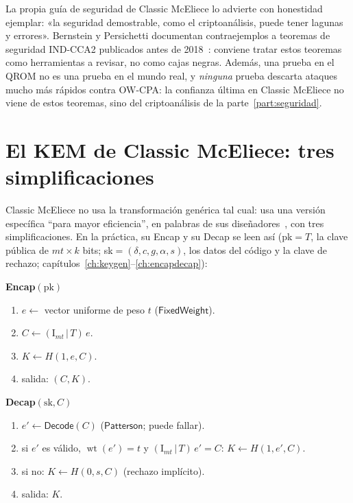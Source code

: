 \documentclass[11pt,a4paper,oneside]{report}
\newcommand{\wt}{\operatorname{wt}}
\begin{document}
\begin{rigor}
La propia guía de seguridad de Classic McEliece lo advierte con
honestidad ejemplar: «la seguridad demostrable, como el
criptoanálisis, puede tener lagunas y errores». Bernstein y Persichetti
documentan contraejemplos a teoremas de seguridad IND-CCA2 publicados
antes de 2018~\cite{bp2018}: conviene tratar estos teoremas como
herramientas a revisar, no como cajas negras. Además, una prueba en el
QROM no es una prueba en el mundo real, y \emph{ninguna} prueba
descarta ataques mucho más rápidos contra OW-CPA: la confianza última
en Classic McEliece no viene de estos teoremas, sino del criptoanálisis
de la parte~\ref{part:seguridad}.
\end{rigor}

\section{El KEM de Classic McEliece: tres simplificaciones}

Classic McEliece no usa la transformación genérica tal cual: usa una
versión específica ``para mayor eficiencia'', en palabras de sus
diseñadores~\cite{cmrationale}, con tres simplificaciones. En la
práctica, su \textsf{Encap} y su \textsf{Decap} se leen así
(pk$=T$, la clave pública de $mt\times k$ bits;
sk$=(\delta,c,g,\alpha,s)$, los datos del código y la clave de rechazo;
capítulos~\ref{ch:keygen}--\ref{ch:encapdecap}):

\begin{practica}
\begin{minipage}[t]{0.47\textwidth}\raggedright
\textbf{\textsf{Encap}$(\mathrm{pk})$}
\begin{enumerate}[leftmargin=1.4em,itemsep=2pt,topsep=2pt]
  \item $e\leftarrow$ vector uniforme de peso $t$
        ($\textsf{FixedWeight}$).
  \item $C\leftarrow(\mathrm{I}_{mt}\,|\,T)\,e$.
  \item $K\leftarrow H(1,e,C)$.
  \item salida: $(C,K)$.
\end{enumerate}
\end{minipage}\hfill
\begin{minipage}[t]{0.47\textwidth}\raggedright
\textbf{\textsf{Decap}$(\mathrm{sk},C)$}
\begin{enumerate}[leftmargin=1.4em,itemsep=2pt,topsep=2pt]
  \item $e'\leftarrow\textsf{Decode}(C)$
        ($\textsf{Patterson}$; puede fallar).
  \item si $e'$ es válido, $\wt(e')=t$ y
        $(\mathrm{I}_{mt}\,|\,T)\,e'=C$:
        $K\leftarrow H(1,e',C)$.
  \item si no: $K\leftarrow H(0,s,C)$ (rechazo implícito).
  \item salida: $K$.
\end{enumerate}
\end{minipage}
\end{practica}
\end{document}
